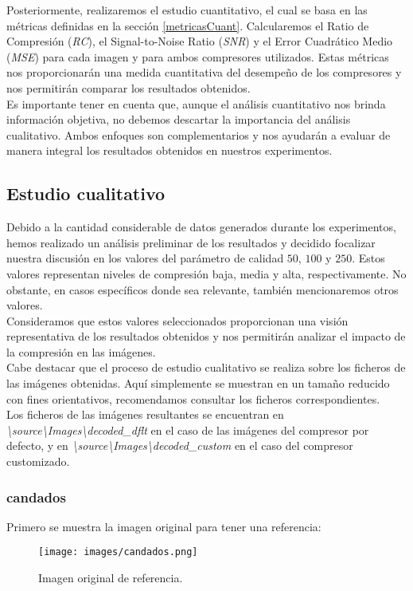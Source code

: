 \documentclass[12pt,a4paper]{article}
\begin{document}
Posteriormente, realizaremos el estudio cuantitativo, el cual se basa en las métricas definidas en la sección \ref{metricasCuant}. Calcularemos el Ratio de Compresión (\textit{RC}), el Signal-to-Noise Ratio (\textit{SNR}) y el Error Cuadrático Medio (\textit{MSE}) para cada imagen y para ambos compresores utilizados. Estas métricas nos proporcionarán una medida cuantitativa del desempeño de los compresores y nos permitirán comparar los resultados obtenidos.\\

Es importante tener en cuenta que, aunque el análisis cuantitativo nos brinda información objetiva, no debemos descartar la importancia del análisis cualitativo. Ambos enfoques son complementarios y nos ayudarán a evaluar de manera integral los resultados obtenidos en nuestros experimentos.\\

\subsection{Estudio cualitativo}
Debido a la cantidad considerable de datos generados durante los experimentos, hemos realizado un análisis preliminar de los resultados y decidido focalizar nuestra discusión en los valores del parámetro de calidad $50$, $100$ y $250$. Estos valores representan niveles de compresión baja, media y alta, respectivamente. No obstante, en casos específicos donde sea relevante, también mencionaremos otros valores.\\

Consideramos que estos valores seleccionados proporcionan una visión representativa de los resultados obtenidos y nos permitirán analizar el impacto de la compresión en las imágenes.\\

Cabe destacar que el proceso de estudio cualitativo se realiza sobre los ficheros de las imágenes obtenidas. Aquí simplemente se muestran en un tamaño reducido con fines orientativos, recomendamos consultar los ficheros correspondientes.\\

Los ficheros de las imágenes resultantes se encuentran en \textit{\textbackslash source\textbackslash Images\textbackslash decoded\_dflt} en el caso de las imágenes del compresor por defecto, y en \textit{\textbackslash source\textbackslash Images\textbackslash decoded\_custom} en el caso del compresor customizado.

\subsubsection{candados}
Primero se muestra la imagen original para tener una referencia:
\begin{figure}[H]
    \centering
    \texttt{[image: images/candados.png]}
    \caption[Referencia - candados]{Imagen original de referencia.}
    \label{fig:top_candados}
\end{figure}
    \vspace{0.5cm}
\end{document}
